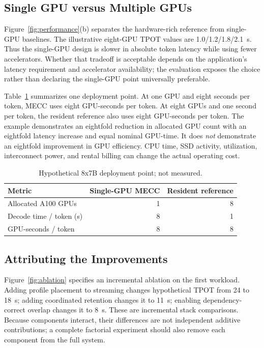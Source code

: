 \documentclass[conference,9pt,letterpaper]{IEEEtran}
\newcommand{\mecc}{\textsc{MECC}}
\begin{document}
\subsection{Single GPU versus Multiple GPUs}
Figure~\ref{fig:performance}(b) separates the hardware-rich reference from single-GPU baselines. The illustrative eight-GPU TPOT values are 1.0/1.2/1.8/2.1~s. Thus the single-GPU design is slower in absolute token latency while using fewer accelerators. Whether that tradeoff is acceptable depends on the application's latency requirement and accelerator availability; the evaluation exposes the choice rather than declaring the single-GPU point universally preferable.

Table~\ref{tab:gpu} summarizes one deployment point. At one GPU and eight seconds per token, \mecc{} uses eight GPU-seconds per token. At eight GPUs and one second per token, the resident reference also uses eight GPU-seconds per token. The example demonstrates an eightfold reduction in allocated GPU count with an eightfold latency increase and equal nominal GPU-time. It does \emph{not} demonstrate an eightfold improvement in GPU efficiency. CPU time, SSD activity, utilization, interconnect power, and rental billing can change the actual operating cost.

\begin{table}[t]
\caption{Hypothetical 8x7B deployment point; not measured.}
\label{tab:gpu}\centering
\begin{tabular}{lrr}\toprule
Metric & Single-GPU \mecc{} & Resident reference\\\midrule
Allocated A100 GPUs & 1 & 8\\
Decode time / token (s) & 8 & 1\\
GPU-seconds / token & 8 & 8\\\bottomrule
\end{tabular}
\end{table}

\subsection{Attributing the Improvements}
Figure~\ref{fig:ablation} specifies an incremental ablation on the first workload. Adding profile placement to streaming changes hypothetical TPOT from 24 to 18~s; adding coordinated retention changes it to 11~s; enabling dependency-correct overlap changes it to 8~s. These are incremental stack comparisons. Because components interact, their differences are not independent additive contributions; a complete factorial experiment should also remove each component from the full system.
\end{document}
